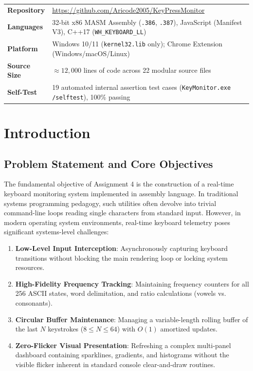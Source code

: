 \documentclass[11pt,a4paper]{article}
\begin{document}
\vspace{0.6em}
\noindent
\begin{center}
\small
\begin{tabularx}{\textwidth}{lX}
  \toprule
  \textbf{Repository} & \url{https://github.com/Aricode2005/KeyPressMonitor} \\
  \textbf{Languages}  & 32-bit x86 MASM Assembly (\texttt{.386}, \texttt{.387}), JavaScript (Manifest V3), C++17 (\texttt{WH\_KEYBOARD\_LL}) \\
  \textbf{Platform}   & Windows 10/11 (\texttt{kernel32.lib} only); Chrome Extension (Windows/macOS/Linux) \\
  \textbf{Source Size}& $\approx 12,000$ lines of code across 22 modular source files \\
  \textbf{Self-Test}  & 19 automated internal assertion test cases (\texttt{KeyMonitor.exe /selftest}), 100\% passing \\
  \bottomrule
\end{tabularx}
\end{center}

\vspace{0.5em}
\tableofcontents
\newpage

\section{Introduction}

\subsection{Problem Statement and Core Objectives}
The fundamental objective of Assignment 4 is the construction of a real-time keyboard monitoring system implemented in assembly language. In traditional systems programming pedagogy, such utilities often devolve into trivial command-line loops reading single characters from standard input. However, in modern operating system environments, real-time keyboard telemetry poses significant systems-level challenges:
\begin{enumerate}[leftmargin=*]
  \item \textbf{Low-Level Input Interception}: Asynchronously capturing keyboard transitions without blocking the main rendering loop or locking system resources.
  \item \textbf{High-Fidelity Frequency Tracking}: Maintaining frequency counters for all 256 ASCII states, word delimitation, and ratio calculations (vowels vs. consonants).
  \item \textbf{Circular Buffer Maintenance}: Managing a variable-length rolling buffer of the last $N$ keystrokes ($8 \le N \le 64$) with $O(1)$ amortized updates.
  \item \textbf{Zero-Flicker Visual Presentation}: Refreshing a complex multi-panel dashboard containing sparklines, gradients, and histograms without the visible flicker inherent in standard console clear-and-draw routines.
\end{enumerate}
\end{document}
